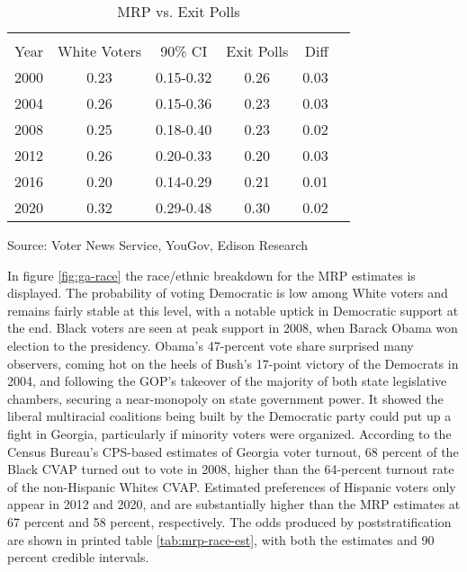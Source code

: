 \begin{table}[ht]
\centering
\begin{threeparttable}
\caption{MRP vs. Exit Polls}  
\label{tab:exits-both}
\begin{tabular}{rcccrr}
  \hline \\ \vspace{0.5em}
Year & White Voters & 90\% CI & Exit Polls & Diff \vspace{0.5em} \\ 
  \hline
2000 & 0.23 & 0.15-0.32 & 0.26 & 0.03  \\ 
  2004 & 0.26 & 0.15-0.36 & 0.23 & 0.03  \\ 
  2008 & 0.25 & 0.18-0.40 & 0.23 & 0.02   \\ 
    2012 & 0.26 & 0.20-0.33 & 0.20 & 0.03   \\ 
2016 & 0.20 & 0.14-0.29 & 0.21 & 0.01  \\ 
  2020 & 0.32 & 0.29-0.48 & 0.30 & 0.02 \\
   \hline
\end{tabular}
{\footnotesize Source: Voter News Service, YouGov, Edison Research}
\end{threeparttable}
\end{table}

In figure \ref{fig:ga-race} the race/ethnic breakdown for the MRP estimates is displayed. The probability of voting Democratic is low among White voters and remains fairly stable at this level, with a notable uptick in Democratic support at the end. Black voters are seen at peak support in 2008, when Barack Obama won election to the presidency. Obama's 47-percent vote share surprised many observers, coming hot on the heels of Bush's 17-point victory of the Democrats in 2004, and following the GOP's takeover of the majority of both state legislative chambers, securing a near-monopoly on state government power. It showed the liberal multiracial coalitions being built by the Democratic party could put up a fight in Georgia, particularly if minority voters were organized. According to the Census Bureau's CPS-based estimates of Georgia voter turnout, 68 percent of the Black CVAP turned out to vote in 2008, higher than the 64-percent turnout rate of the non-Hispanic Whites CVAP. Estimated preferences of Hispanic voters only appear in 2012 and 2020, and are substantially higher than the MRP estimates at 67 percent and 58 percent, respectively. The odds produced by poststratification are shown in printed table \ref{tab:mrp-race-est}, with both the estimates and 90 percent credible intervals.


